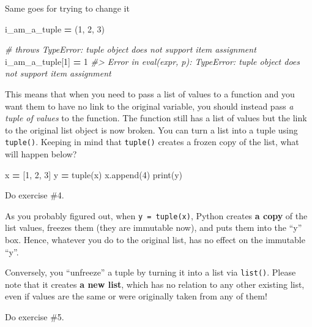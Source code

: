 \documentclass[
]{book}
\newenvironment{Shaded}{\begin{snugshade}}{\end{snugshade}}
\newcommand{\BuiltInTok}[1]{#1}
\newcommand{\CommentTok}[1]{\textcolor[rgb]{0.56,0.35,0.01}{\textit{#1}}}
\newcommand{\DecValTok}[1]{\textcolor[rgb]{0.00,0.00,0.81}{#1}}
\newcommand{\NormalTok}[1]{#1}
\newcommand{\OperatorTok}[1]{\textcolor[rgb]{0.81,0.36,0.00}{\textbf{#1}}}
\begin{document}
Same goes for trying to change it

\begin{Shaded}
\begin{Highlighting}[]
\NormalTok{i\_am\_a\_tuple }\OperatorTok{=}\NormalTok{ (}\DecValTok{1}\NormalTok{, }\DecValTok{2}\NormalTok{, }\DecValTok{3}\NormalTok{)}

\CommentTok{\# throws TypeError: \textquotesingle{}tuple\textquotesingle{} object does not support item assignment}
\NormalTok{i\_am\_a\_tuple[}\DecValTok{1}\NormalTok{] }\OperatorTok{=} \DecValTok{1} 
\CommentTok{\#\textgreater{} Error in eval(expr, p): TypeError: \textquotesingle{}tuple\textquotesingle{} object does not support item assignment}
\end{Highlighting}
\end{Shaded}

This means that when you need to pass a list of values to a function and you want them to have no link to the original variable, you should instead pass \emph{a tuple of values} to the function. The function still has a list of values but the link to the original list object is now broken. You can turn a list into a tuple using \texttt{tuple()}. Keeping in mind that \texttt{tuple()} creates a frozen copy of the list, what will happen below?

\begin{Shaded}
\begin{Highlighting}[]
\NormalTok{x }\OperatorTok{=}\NormalTok{ [}\DecValTok{1}\NormalTok{, }\DecValTok{2}\NormalTok{, }\DecValTok{3}\NormalTok{]}
\NormalTok{y }\OperatorTok{=} \BuiltInTok{tuple}\NormalTok{(x)}
\NormalTok{x.append(}\DecValTok{4}\NormalTok{)}
\BuiltInTok{print}\NormalTok{(y)}
\end{Highlighting}
\end{Shaded}

Do exercise \#4.

As you probably figured out, when \texttt{y\ =\ tuple(x)}, Python creates \textbf{a copy} of the list values, freezes them (they are immutable now), and puts them into the ``y'' box. Hence, whatever you do to the original list, has no effect on the immutable ``y''.

Conversely, you ``unfreeze'' a tuple by turning it into a list via \texttt{list()}. Please note that it creates \textbf{a new list}, which has no relation to any other existing list, even if values are the same or were originally taken from any of them!

Do exercise \#5.
\end{document}
